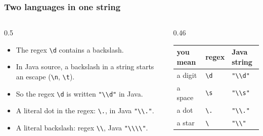 \documentclass[aspectratio=169,10pt,compress]{beamer}
\begin{document}




\begin{frame}[t,fragile] \frametitle{Two languages in one string}
  \begin{columns}[T]
    \begin{column}{0.5\textwidth}
      \begin{itemize}\small
        \item The regex \texttt{\textbackslash d} contains a backslash.
        \item In Java source, a backslash in a string starts an escape (\texttt{\textbackslash n}, \texttt{\textbackslash t}).
        \item So the regex \texttt{\textbackslash d} is written \texttt{"\textbackslash\textbackslash d"} in Java.
        \item A literal dot in the regex: \texttt{\textbackslash .}, in Java \texttt{"\textbackslash\textbackslash ."}.
        \item A literal backslash: regex \texttt{\textbackslash\textbackslash}, Java \texttt{"\textbackslash\textbackslash\textbackslash\textbackslash"}.
      \end{itemize}
    \end{column}
    \begin{column}{0.46\textwidth}
      \begin{center}\small
      \begin{tabular}{lll}
        \toprule
        \textbf{you mean}  & \textbf{regex}                     & \textbf{Java string} \\
        \midrule
        a digit           & \texttt{\textbackslash d}           & \texttt{"\textbackslash\textbackslash d"} \\
        a space           & \texttt{\textbackslash s}           & \texttt{"\textbackslash\textbackslash s"} \\
        a dot             & \texttt{\textbackslash .}           & \texttt{"\textbackslash\textbackslash ."} \\
        a star            & \texttt{\textbackslash *}           & \texttt{"\textbackslash\textbackslash *"} \\
        \bottomrule
      \end{tabular}
      \end{center}
    \end{column}
  \end{columns}
\end{frame}
\end{document}
